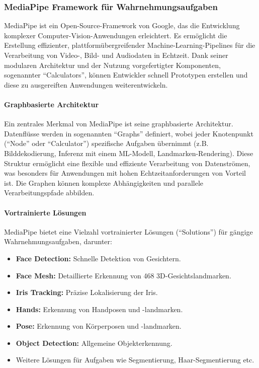 \subsubsection{MediaPipe Framework für Wahrnehmungsaufgaben}

MediaPipe ist ein Open-Source-Framework von Google, das die Entwicklung komplexer Computer-Vision-Anwendungen erleichtert. Es ermöglicht die Erstellung effizienter, plattformübergreifender Machine-Learning-Pipelines für die Verarbeitung von Video-, Bild- und Audiodaten in Echtzeit. Dank seiner modularen Architektur und der Nutzung vorgefertigter Komponenten, sogenannter ``Calculators'', können Entwickler schnell Prototypen erstellen und diese zu ausgereiften Anwendungen weiterentwickeln.

\paragraph{Graphbasierte Architektur}
Ein zentrales Merkmal von MediaPipe ist seine graphbasierte Architektur. Datenflüsse werden in sogenannten ``Graphs'' definiert, wobei jeder Knotenpunkt (``Node'' oder ``Calculator'') spezifische Aufgaben übernimmt (z.B. Bilddekodierung, Inferenz mit einem ML-Modell, Landmarken-Rendering). Diese Struktur ermöglicht eine flexible und effiziente Verarbeitung von Datenströmen, was besonders für Anwendungen mit hohen Echtzeitanforderungen von Vorteil ist. Die Graphen können komplexe Abhängigkeiten und parallele Verarbeitungspfade abbilden.

\paragraph{Vortrainierte Lösungen}
MediaPipe bietet eine Vielzahl vortrainierter Lösungen (``Solutions'') für gängige Wahrnehmungsaufgaben, darunter:

\begin{itemize}
    \item \textbf{Face Detection:} Schnelle Detektion von Gesichtern.
    \item \textbf{Face Mesh:} Detaillierte Erkennung von 468 3D-Gesichtslandmarken.
    \item \textbf{Iris Tracking:} Präzise Lokalisierung der Iris.
    \item \textbf{Hands:} Erkennung von Handposen und -landmarken.
    \item \textbf{Pose:} Erkennung von Körperposen und -landmarken.
    \item \textbf{Object Detection:} Allgemeine Objekterkennung.
    \item Weitere Lösungen für Aufgaben wie Segmentierung, Haar-Segmentierung etc.
\end{itemize}

